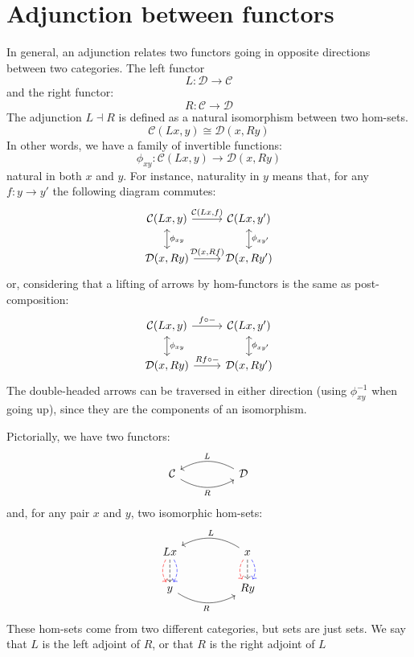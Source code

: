\documentclass[DaoFP]{subfiles}
\begin{document}
\section{Adjunction between functors}

In general, an adjunction relates two functors going in opposite directions between two categories. The left functor 
\[ L \colon \mathcal{D} \to \mathcal{C}\]
and the right functor:
\[ R \colon \mathcal{C} \to  \mathcal{D} \]
The adjunction $L \dashv R$ is defined as a natural isomorphism between two hom-sets.
\[  \mathcal{C} (L x, y) \cong \mathcal{D}( x , R y)\]
In other words, we have a family of invertible functions:
\[ \phi_{x y} \colon  \mathcal{C} (L x, y) \to \mathcal{D}( x , R y) \]
natural in both $x$ and $y$. For instance, naturality in $y$ means that, for any $f \colon y \to y'$ the following diagram commutes:
\[
 \begin{tikzcd}
 \mathcal{C}(L x, y)
 \arrow[d, leftrightarrow, "\phi_{x y}"]
 \arrow[r, "{\mathcal{C}(L x, f)}"]
 &
 \mathcal{C}(L x, y')
  \arrow[d, leftrightarrow, "\phi_{x y'}"]
 \\
 \mathcal{D}(x, R y)
 \arrow[r, "{\mathcal{D}(x, R f)}"]
& \mathcal{D}(x, R y')
 \end{tikzcd}
\]
or, considering that a lifting of arrows by hom-functors is the same as post-composition:
\[
 \begin{tikzcd}
 \mathcal{C}(L x, y)
 \arrow[d, leftrightarrow, "\phi_{x y}"]
 \arrow[r, "f \circ -"]
 &
 \mathcal{C}(L x, y')
  \arrow[d, leftrightarrow, "\phi_{x y'}"]
 \\
 \mathcal{D}(x, R y)
 \arrow[r, "R f \circ -"]
& \mathcal{D}(x, R y')
 \end{tikzcd}
\]
The double-headed arrows can be traversed in either direction (using $\phi^{-1}_{x y}$ when going up), since they are the components of an isomorphism.


Pictorially, we have two functors:
\[
 \begin{tikzcd}
  \mathcal{C}
  \arrow[rr, bend right, "R"']
  &&
  \mathcal{D}
  \arrow[ll, bend right, "L"']
  \end{tikzcd}
\]
and, for any pair $x$ and $y$, two isomorphic hom-sets:
\[
 \begin{tikzcd}
L x
\arrow[d, bend right, red, dashed]
\arrow[d, dashed]
\arrow[d, bend left, blue, dashed]
  &&
  x
\arrow[d, bend right, red, dashed]
\arrow[d, dashed]
\arrow[d, bend left, blue, dashed]
 \arrow[ll, bend right, "L"']
 \\
y
   \arrow[rr, bend right, "R"']
 &&
 R y
  \end{tikzcd}
\]
 These hom-sets come from two different categories, but sets are just sets. We say that $L$ is the left adjoint of $R$, or that $R$ is the right adjoint of $L$
\end{document}

